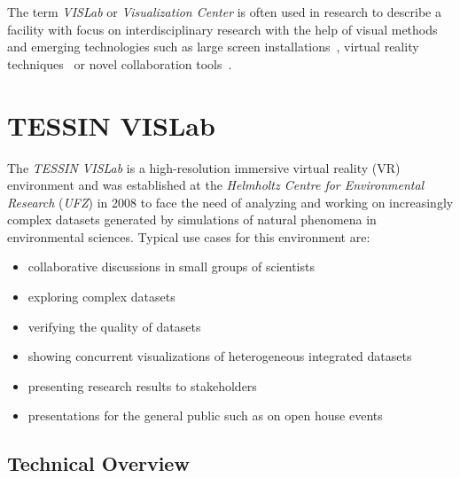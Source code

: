 \documentclass[twocolumn]{svjour3}          %
\begin{document}
The term \emph{VISLab} or \emph{Visualization Center} is often used in research to describe a facility with focus on interdisciplinary research with the help of visual methods and emerging technologies such as large screen installations~\cite{web:kaust}, virtual reality techniques~\cite{bryson:vr,burdea:vr} or novel collaboration tools~\cite{johnson:tele-immersivecollaboration}.


\section{TESSIN VISLab}
\label{tessin-vislab}

The \emph{TESSIN VISLab} is a high-resolution immersive virtual reality (VR) environment and was established at the \emph{Helmholtz Centre for Environmental Research} (\emph{UFZ}) in 2008 to face the need of analyzing and working on increasingly complex datasets generated by simulations of natural phenomena in environmental sciences. Typical use cases for this environment are:

\begin{itemize}
\itemsep1pt\parskip0pt
\item
  collaborative discussions in small groups of scientists
\item
  exploring complex datasets
\item
  verifying the quality of datasets
\item
  showing concurrent visualizations of heterogeneous integrated datasets
\item
  presenting research results to stakeholders
\item
  presentations for the general public such as on open house events
\end{itemize}

\subsection{Technical Overview}
\label{technical-overview}
\end{document}
